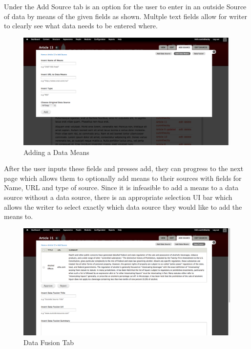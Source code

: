 \documentclass[12pt]{article} %
\begin{document}
Under the Add Source tab is an option for the user to enter in an outside Source of data by means of the given fields as shown. Multple text fields allow for writer to clearly see what data needs to be entered where.

\begin{figure}[htbp]
\begin{center}
\includegraphics[width=6in]{images/addDataMeans}
\caption{Adding a Data Means}
\end{center}
\end{figure}

After the user inputs these fields and presses add, they can progress to the next page which allows them to optionally add means to their sources with fields for Name, URL and type of source. Since it is infeasible to add a means to a data source without a data source, there is an appropriate selection UI bar which allows the writer to select exactly which data source they would like to add the means to.

\begin{figure}[htbp]
\begin{center}
\includegraphics[width=6in]{images/dataFusionTab}
\caption{Data Fusion Tab}
\end{center}
\end{figure}
\end{document}

